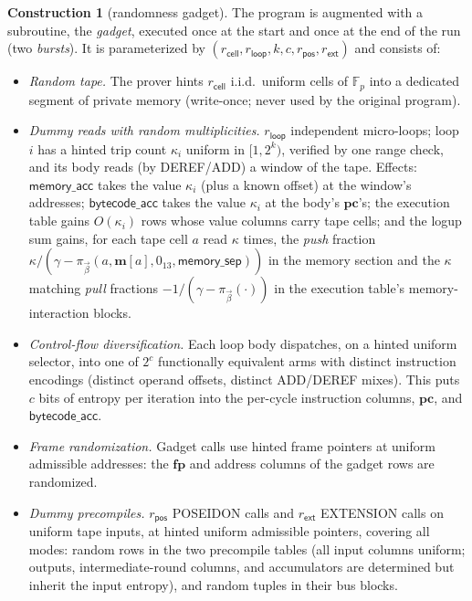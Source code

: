 \documentclass{article}
\newcommand{\Fp}{\mathbb{F}_p}
\theoremstyle{definition}
\newtheorem{construction}[theorem]{Construction}
\begin{document}
\begin{construction}[randomness gadget]\label{con:gadget}
The program is augmented with a subroutine, the \emph{gadget}, executed once at the start and once at the end of the run (two \emph{bursts}). It is parameterized by $(r_{\mathsf{cell}}, r_{\mathsf{loop}}, k, c, r_{\mathsf{pos}}, r_{\mathsf{ext}})$ and consists of:
\begin{itemize}
    \item[(G1)] \emph{Random tape.} The prover hints $r_{\mathsf{cell}}$ i.i.d.\ uniform cells of $\Fp$ into a dedicated segment of private memory (write-once; never used by the original program).
    \item[(G2)] \emph{Dummy reads with random multiplicities.} $r_{\mathsf{loop}}$ independent micro-loops; loop $i$ has a hinted trip count $\kappa_i$ uniform in $[1, 2^k)$, verified by one range check, and its body reads (by \textsc{DEREF}/\textsc{ADD}) a window of the tape. Effects: $\textsf{memory\_acc}$ takes the value $\kappa_i$ (plus a known offset) at the window's addresses; $\textsf{bytecode\_acc}$ takes the value $\kappa_i$ at the body's $\textbf{pc}$'s; the execution table gains $O(\kappa_i)$ rows whose value columns carry tape cells; and the logup sum gains, for each tape cell $a$ read $\kappa$ times, the \emph{push} fraction $\kappa / (\gamma - \pi_{\vec\beta}(a, \textbf{m}[a], 0_{13}, \textsf{memory\_sep}))$ in the memory section and the $\kappa$ matching \emph{pull} fractions $-1/(\gamma - \pi_{\vec\beta}(\cdot))$ in the execution table's memory-interaction blocks.
    \item[(G3)] \emph{Control-flow diversification.} Each loop body dispatches, on a hinted uniform selector, into one of $2^c$ functionally equivalent arms with distinct instruction encodings (distinct operand offsets, distinct \textsc{ADD}/\textsc{DEREF} mixes). This puts $c$ bits of entropy per iteration into the per-cycle instruction columns, $\textbf{pc}$, and $\textsf{bytecode\_acc}$.
    \item[(G4)] \emph{Frame randomization.} Gadget calls use hinted frame pointers at uniform admissible addresses: the $\textbf{fp}$ and address columns of the gadget rows are randomized.
    \item[(G5)] \emph{Dummy precompiles.} $r_{\mathsf{pos}}$ \textsc{POSEIDON} calls and $r_{\mathsf{ext}}$ \textsc{EXTENSION} calls on uniform tape inputs, at hinted uniform admissible pointers, covering all modes: random rows in the two precompile tables (all input columns uniform; outputs, intermediate-round columns, and accumulators are determined but inherit the input entropy), and random tuples in their bus blocks.

\end{itemize}
\end{construction}
\end{document}
